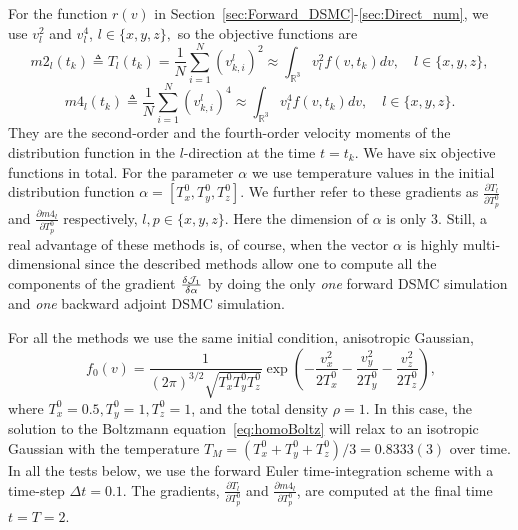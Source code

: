 \documentclass[times,final,nopreprintline]{elsarticle}
\newcommand{\bbR}{\mathbb R} \newcommand{\bbS}{\mathbb S}
\begin{document}
For the function $r(v)$ in Section~\ref{sec:Forward_DSMC}-\ref{sec:Direct_num}, we use $v_l^2$ and $v_l^4$, $l\in\{x,y,z\},$ so the objective functions are 
$$m2_l(t_k) \triangleq T_l(t_k)=\frac{1}{N}\sum_{i=1}^N{(v_{k,i}^l)^2 } \approx \int_{\bbR^3} v_l^2 f(v,t_k) dv,\quad l\in\{x,y,z\},$$ $$m4_l(t_k) \triangleq\frac{1}{N}\sum_{i=1}^N{(v_{k,i}^l)^4 } \approx \int_{\bbR^3} v_l^4 f(v,t_k) dv, \quad l\in\{x,y,z\}.$$
They are the second-order and the fourth-order velocity moments of the distribution function in the $l$-direction at the time $t=t_k$. We have six objective functions in total.  For the parameter $\alpha$ we use temperature values in the initial distribution function $\alpha=[T_x^0, T_y^0, T_z^0]$. We further refer to these gradients as $\frac{\partial T_l}{\partial T_p^0}$ and $\frac{\partial m4_l}{\partial T_p^0}$ respectively, $l,p\in\{x,y,z\}$. 
Here the dimension of $\alpha$ is only 3. Still, a real advantage of these methods is, of course, when the vector $\alpha$ is highly multi-dimensional since the described methods allow one to compute all the components of the gradient $\frac{\delta \mathcal J_1}{\delta \alpha}$ by doing the only \textit{one} forward DSMC simulation and \textit{one} backward adjoint DSMC simulation.


For all the methods we use the same initial condition, anisotropic Gaussian, 
\begin{equation}~\label{eq:IC}
f_0(v) = \frac{1}{(2\pi)^{3/2}\sqrt{T_x^0 T_y^0 T_z^0}} \exp\left(-\frac{v_x^2}{2T_x^0}-\frac{v_y^2}{2T_y^0}-\frac{v_z^2}{2T_z^0}\right),
\end{equation}
where $T_x^0=0.5,T_y^0=1,T_z^0=1$, and the total density $\rho=1$. In this case, the solution to the Boltzmann equation~\eqref{eq:homoBoltz} will relax to an isotropic Gaussian with the temperature $T_M=(T_x^0+T_y^0+T_z^0)/3=0.8333(3)$ over time. In all the tests below, we use the forward Euler time-integration scheme with a time-step $\Delta t=0.1$. The gradients, $\frac{\partial T_l}{\partial T_p^0}$ and  $\frac{\partial m4_l}{\partial T_p^0}$, are computed at the final time $t=T=2$.





\end{document}
